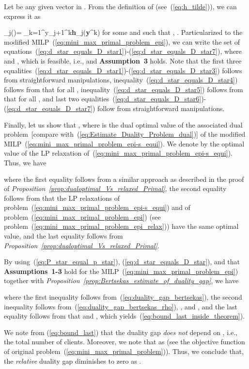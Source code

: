 \documentclass[journal, 10pt, twocolumn]{IEEEtran}
\newcommand{\be}{}
\renewcommand{\vec}[1]{\bf{#1}}     \newcommand{\vecsc}[1]{\mbox {\boldmath \scriptsize }}     \newcommand{\itvec}[1]{\mbox {\boldmath }}
\begin{document}
Let  be any given vector in . From the definition of  (see~(\ref{eq:h_tilde})), we can express it as
\be
\tilde{\vec h}_j(\tilde{\vec y})= \sum_{k=1}^{y_j+1}\alpha^k{\vec h}_j({\vec y}^k)
\ee
for some  and  such that , . Particularized to the modified MILP~(\ref{eq:mini_max_primal_problem_epi}), we can write the set of equations~(\ref{eq:d_star_equals_D_star1})-(\ref{eq:d_star_equals_D_star7}),
where  and , which is feasible, i.e.,   and \textbf{Assumption~3} holds. Note that the first three equalities~(\ref{eq:d_star_equals_D_star1})-(\ref{eq:d_star_equals_D_star3}) follows from straightforward manipulations,  inequality~(\ref{eq:d_star_equals_D_star4}) follows from that  for all , inequality~(\ref{eq:d_star_equals_D_star5}) follows from that  for all , and last two equalities~(\ref{eq:d_star_equals_D_star6})-(\ref{eq:d_star_equals_D_star7}) follow from straightforward manipulations.


Finally, let us show that , where  is the dual optimal value of the associated dual problem~[compare with~(\ref{eq:Estimate_Duality_Problem_dual})] of the modified MILP~(\ref{eq:mini_max_primal_problem_epi-s_equi}). We denote by  the optimal value of the LP relaxation of~(\ref{eq:mini_max_primal_problem_epi-s_equi}). Thus, we have \addtocounter{equation}{1}

where the first equality follows from a similar approach as described in the proof of \emph{Proposition~\ref{prop:dualoptimal_Vs_relaxed_Primal}}, the second equality follows from that the LP relaxations of problem~(\ref{eq:mini_max_primal_problem_epi-s_equi}) and of problem~(\ref{eq:mini_max_primal_problem_epi}) (see problem~(\ref{eq:mini_max_primal_problem_epi_relax})) have the same optimal value, and the last equality follows from \emph{Proposition~\ref{prop:dualoptimal_Vs_relaxed_Primal}}.

By using~(\ref{eq:P_star_equal_p_star}), (\ref{eq:d_star_equals_D_star}), and that \textbf{Assumptions~1-3} hold for the MILP~(\ref{eq:mini_max_primal_problem_epi}) together with \emph{Proposition~\ref{prop:Bertsekas_estimate_of_duality_gap}}, we have

where the first inequality follows from~(\ref{eq:duality_gap_bertsekas}), the second inequality follows from~(\ref{eq:duality_gap_bertsekas_rho}), , and , and the last equality follows from that  and , which yields~(\ref{eq:bound_last_inside_theorem}).

We note from (\ref{eq:bound_last}) that the duality gap \emph{does not} depend on , i.e., the total number of clients. Moreover, we note that  as  (see the objective function of original problem~(\ref{eq:mini_max_primal_problem})). Thus, we conclude that, the \emph{relative} duality gap  diminishes to zero as .




 

\end{document}
